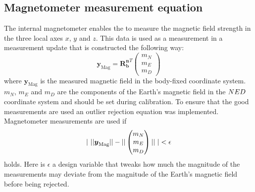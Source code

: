 \subsection{Magnetometer measurement equation}
The internal magnetometer enables the \abbrROV to measure the magnetic field strength in the three local axes $x$, $y$ and $z$. This data is used as a measurement in a measurement update that is constructed the following way:
\begin{equation}
\boldsymbol{y}_{\text{Mag}} = 
    \boldsymbol{R^n_b}^T
    \begin{pmatrix}
        m_N\\
        m_E\\
        m_D
    \end{pmatrix}
\end{equation}
where $\boldsymbol{y}_{\text{Mag}}$ is the measured magnetic field in the body-fixed coordinate system. $m_N$, $m_E$ and $m_D$ are the components of the Earth's magnetic field in the $NED$ coordinate system and should be set during calibration.
To ensure that the good measurements are used an outlier rejection equation was implemented. Magnetometer measurements are used if 
\begin{equation}
        |~||
\boldsymbol{y}_{\text{Mag}}||
    -
    ||
    \begin{pmatrix}
        m_N\\
        m_E\\
        m_D
    \end{pmatrix}||
     ~| < \epsilon
\end{equation}
holds. Here is $\epsilon$ a design variable that tweaks how much the magnitude of the measurements may deviate from the magnitude of the Earth's magnetic field before being rejected.

